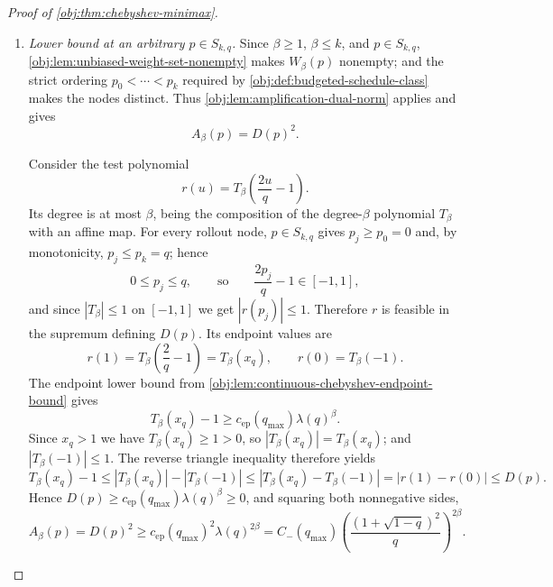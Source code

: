 \documentclass[11pt]{article}
\begin{document}
\begin{proof}[Proof of \cref{obj:thm:chebyshev-minimax}]
\begin{enumerate}
\item \emph{Lower bound at an arbitrary \(p\in S_{k,q}\).}
Since \(\beta\ge1\), \(\beta\le k\), and \(p\in S_{k,q}\), \cref{obj:lem:unbiased-weight-set-nonempty}
makes \(W_\beta(p)\) nonempty; and the strict ordering \(p_0<\cdots<p_k\) required by
\cref{obj:def:budgeted-schedule-class} makes the nodes distinct. Thus
\cref{obj:lem:amplification-dual-norm} applies and gives
\[
A_\beta(p)=D(p)^2 .
\]

Consider the test polynomial
\[
r(u)=T_\beta\!\left(\frac{2u}{q}-1\right).
\]
Its degree is at most \(\beta\), being the composition of the degree-\(\beta\) polynomial \(T_\beta\) with an affine map. %
For every rollout node, \(p\in S_{k,q}\) gives \(p_j\ge p_0=0\) and, by monotonicity, \(p_j\le p_k=q\); hence
\[
0\le p_j\le q,
\qquad\text{so}\qquad
\frac{2p_j}{q}-1\in[-1,1],
\]
and since \(|T_\beta|\le1\) on \([-1,1]\) we get \(|r(p_j)|\le1\). %
Therefore \(r\) is feasible in the supremum defining \(D(p)\). Its endpoint values are
\[
r(1)=T_\beta\!\left(\frac2q-1\right)=T_\beta(x_q),
\qquad
r(0)=T_\beta(-1).
\]
The endpoint lower bound from \cref{obj:lem:continuous-chebyshev-endpoint-bound} gives
\[
T_\beta(x_q)-1\ge c_{\mathrm{ep}}(q_{\max})\lambda(q)^\beta .
\]
Since \(x_q>1\) we have \(T_\beta(x_q)\ge1>0\), so \(|T_\beta(x_q)|=T_\beta(x_q)\); and \(|T_\beta(-1)|\le1\). The reverse triangle inequality therefore yields
\[
T_\beta(x_q)-1
\le
|T_\beta(x_q)|-|T_\beta(-1)|
\le |T_\beta(x_q)-T_\beta(-1)|
=|r(1)-r(0)|
\le D(p).
\]
Hence \(D(p)\ge c_{\mathrm{ep}}(q_{\max})\lambda(q)^\beta\ge0\), and squaring both nonnegative sides,
\[
A_\beta(p)=D(p)^2\ge c_{\mathrm{ep}}(q_{\max})^2\lambda(q)^{2\beta}
=
C_-(q_{\max})
\left(\frac{(1+\sqrt{1-q})^2}{q}\right)^{2\beta}.
\]


\end{enumerate}
\end{proof}
\end{document}
